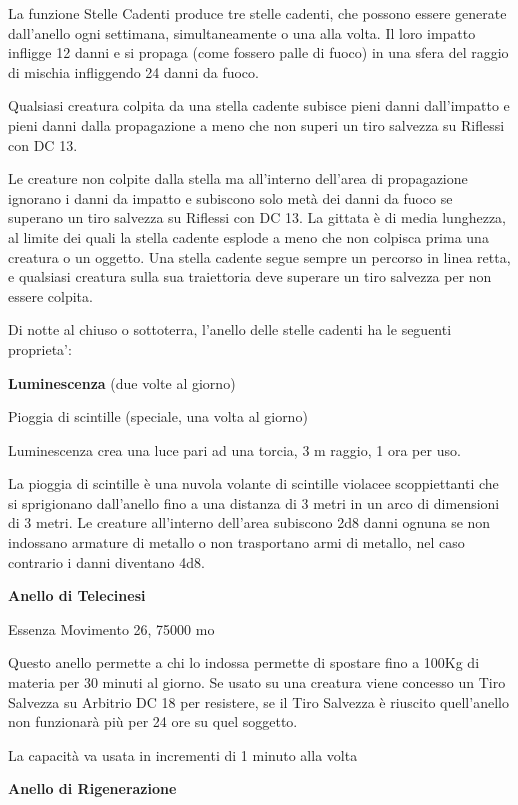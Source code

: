 \documentclass[a4paper,11pt,twoside,openany]{book}
\begin{document}
La funzione Stelle Cadenti produce tre stelle cadenti, che possono essere generate dall'anello ogni settimana, simultaneamente o una alla volta. Il loro impatto infligge 12 danni e si propaga (come fossero palle di fuoco) in una sfera del raggio di mischia infliggendo 24 danni da fuoco.

Qualsiasi creatura colpita da una stella cadente subisce pieni danni dall'impatto e pieni danni dalla propagazione a meno che non superi un tiro salvezza su Riflessi con DC 13.

Le creature non colpite dalla stella ma all'interno dell'area di propagazione ignorano i danni da impatto e subiscono solo metà dei danni da fuoco se superano un tiro salvezza su Riflessi con DC 13. La gittata è di media lunghezza, al limite dei quali la stella cadente esplode a meno che non colpisca prima una creatura o un oggetto. Una stella cadente segue sempre un percorso in linea retta, e qualsiasi creatura sulla sua traiettoria deve superare un tiro salvezza per non essere colpita.

Di notte al chiuso o sottoterra, l'anello delle stelle cadenti ha le seguenti proprieta':

\textbf{Luminescenza} (due volte al giorno)

Pioggia di scintille (speciale, una volta al giorno)

Luminescenza crea una luce pari ad una torcia, 3 m raggio, 1 ora per
uso.

La pioggia di scintille è una nuvola volante di scintille violacee scoppiettanti che si sprigionano dall'anello fino a una distanza di 3 metri in un arco di dimensioni di 3 metri. Le creature all'interno dell'area subiscono 2d8 danni ognuna se non indossano armature di metallo o non trasportano armi di metallo, nel caso contrario i danni diventano 4d8.

\textbf{Anello di Telecinesi}

Essenza Movimento 26, 75000 mo

Questo anello permette a chi lo indossa permette di spostare fino a 100Kg di materia per 30 minuti al giorno. Se usato su una creatura viene concesso un Tiro Salvezza su Arbitrio DC 18 per resistere, se il Tiro Salvezza è riuscito quell'anello non funzionarà più per 24 ore su quel soggetto.

La capacità va usata in incrementi di 1 minuto alla volta

\textbf{Anello di Rigenerazione}
\end{document}
